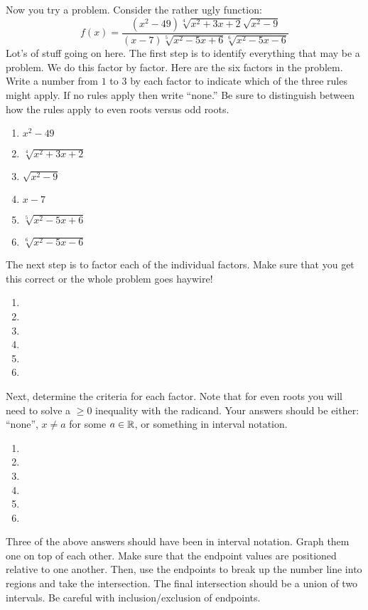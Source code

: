 \documentclass[letterpaper,12pt,fleqn]{article}
\begin{document}
\newpage

Now you try a problem. Consider the rather ugly function:
\[f(x)=\frac{(x^2-49)\sqrt[4]{x^2+3x+2}\sqrt{x^2-9}}
   {(x-7)\sqrt[5]{x^2-5x+6}\sqrt[6]{x^2-5x-6}}\]
Lot's of stuff going on here. The first step is to identify everything that
may be a problem. We do this factor by factor. Here are the six factors in
the problem. Write a number from $1$ to $3$ by each factor to indicate which of the
three rules might apply. If no rules apply then write ``none.'' Be sure to distinguish
between how the rules apply to even roots versus odd roots.
\begin{enumerate}
\item $x^2-49$
\item $\sqrt[4]{x^2+3x+2}$
\item $\sqrt{x^2-9}$
\item $x-7$
\item $\sqrt[5]{x^2-5x+6}$
\item $\sqrt[6]{x^2-5x-6}$
\end{enumerate}

The next step is to factor each of the individual factors. Make sure that you
get this correct or the whole problem goes haywire!
\begin{enumerate}
\item
\item
\item
\item
\item
\item
\end{enumerate}

Next, determine the criteria for each factor. Note that for even roots you
will need to solve a $\ge0$ inequality with the radicand. Your answers should be
either: ``none'', $x\ne a$ for some $a\in\mathbb{R}$, or something in interval notation.

\begin{enumerate}
\item
\item
\item
\item
\item
\item
\end{enumerate}

Three of the above answers should have been in interval notation. Graph them
one on top of each other. Make sure that the endpoint values are positioned
relative to one another. Then, use the endpoints to break up the number line
into regions and take the intersection. The final intersection should be a union
of two intervals. Be careful with inclusion/exclusion of endpoints.
\end{document}
